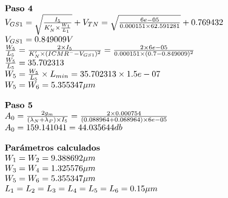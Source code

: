 \begin{equation*}
	\begin{array}{l l}
		\textbf{Paso 4} \\
		V_{GS1} = \sqrt{\frac{I_{5}}{K'_{N}\times\frac{W_{1}}{L_{1}}}}+V_{TN} = \sqrt{\frac{ 6e-05 }{ 0.000151 \times 62.591281 }}+ 0.769432  \\
		V_{GS1} =  0.849009  V \\
		\frac{W_{5}}{L_{5}} = \frac{2\times I_{5}}{K'_{N}\times (ICMR^{-}-V_{{GS1}})^{2}} = \frac{2\times 6e-05 }{ 0.000151 \times ( 0.7 - 0.849009 )^{2}} \\
		\frac{W_5}{L_5} =  35.702313  \\
		W_{5} = \frac{W_5}{L_5} \times L_{min} =  35.702313 \times 1.5e-07  \\
		W_{5} = W_{6} =  5.355347  \mu m \\
		\\
		\textbf{Paso 5} \\
		A_{0} = \frac{2g_{m}}{(\lambda_{N}+\lambda_{P})\times I_{5}} = \frac{2\times 0.000754 }{( 0.088964 + 0.068964 )\times 6e-05 } \\
		A_{0} =  159.141041  =  44.035644  db \\
		\\
		\textbf{Parámetros calculados} \\
		W_{1} = W_{2} =  9.388692  \mu m \\
		W_{3} = W_{4} =  1.325576  \mu m \\
		W_{5} = W_{6} =  5.355347  \mu m \\
		L_{1} = L_{2} = L_{3} = L_{4} = L_{5} = L_{6} = 0.15  \mu m \\
	\end{array}
\end{equation*}